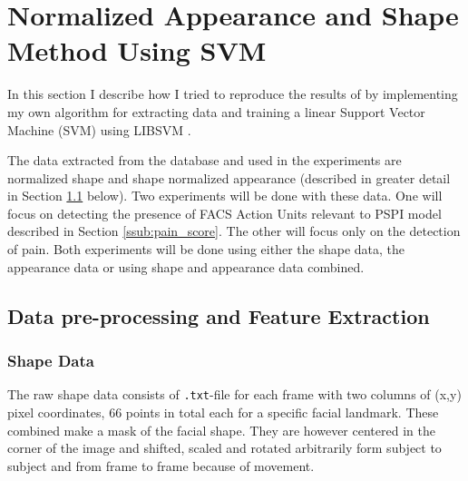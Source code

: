 \documentclass[Main]{subfiles}
\begin{document}
\section{Normalized Appearance and Shape Method Using SVM} %
	\label{sec:normalized_appearance_and_shape_method_using_svm}
	In this section I describe how I tried to reproduce the results of \cite{Lucey2011} by implementing my own algorithm for extracting data and training a linear Support Vector Machine (SVM) using LIBSVM \cite{CC01a}.

	The data extracted from the database and used in the experiments are normalized shape and shape normalized appearance (described in greater detail in Section \ref{sub:data_pre_processing_and_feature_extraction} below).
	Two experiments will be done with these data.
	One will focus on detecting the presence of FACS Action Units relevant to PSPI model described in Section \ref{ssub:pain_score}.
	The other will focus only on the detection of pain.
	Both experiments will be done using either the shape data, the appearance data or using shape and appearance data combined.



		

	\subsection{Data pre-processing and Feature Extraction} %
		\label{sub:data_pre_processing_and_feature_extraction}

		\subsubsection{Shape Data} %
			\label{ssub:shape_data}
			The raw shape data consists of \texttt{.txt}-file for each frame with two columns of (x,y) pixel coordinates, 66 points in total each for a specific facial landmark.
			These combined make a mask of the facial shape.
			They are however centered in the corner of the image and shifted, scaled and rotated arbitrarily form subject to subject and from frame to frame because of movement.
\end{document}
